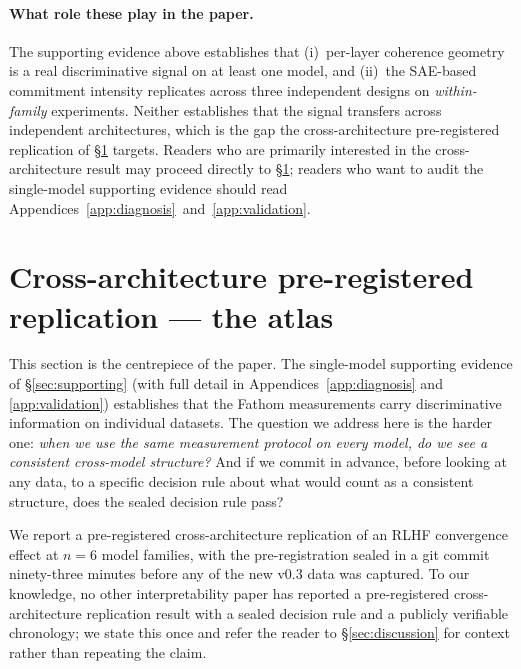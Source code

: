 \documentclass[11pt,letterpaper]{article}
\begin{document}
\paragraph{What role these play in the paper.} The supporting evidence
above establishes that (i)~per-layer coherence geometry is a real
discriminative signal on at least one model, and (ii)~the SAE-based
commitment intensity replicates across three independent designs on
\emph{within-family} experiments. Neither establishes that the signal
transfers across independent architectures, which is the gap the
cross-architecture pre-registered replication of \S\ref{sec:atlas}
targets. Readers who are primarily interested in the cross-architecture
result may proceed directly to \S\ref{sec:atlas}; readers who want to
audit the single-model supporting evidence should read
Appendices~\ref{app:diagnosis}~and~\ref{app:validation}.

\section{Cross-architecture pre-registered replication --- the atlas}
\label{sec:atlas}

This section is the centrepiece of the paper. The single-model supporting
evidence of \S\ref{sec:supporting} (with full detail in
Appendices~\ref{app:diagnosis} and \ref{app:validation}) establishes that
the Fathom measurements carry discriminative information on individual
datasets. The question we address here is the harder one: \emph{when we
use the same measurement protocol on every model, do we see a consistent
cross-model structure?} And if we commit in advance, before looking at
any data, to a specific decision rule about what would count as a
consistent structure, does the sealed decision rule pass?

We report a pre-registered cross-architecture replication of an RLHF
convergence effect at $n\!=\!6$ model families, with the pre-registration
sealed in a git commit ninety-three minutes before any of the new v0.3
data was captured. To our knowledge, no other interpretability paper has
reported a pre-registered cross-architecture replication result with a
sealed decision rule and a publicly verifiable chronology; we state this
once and refer the reader to \S\ref{sec:discussion} for context rather
than repeating the claim.
\end{document}
